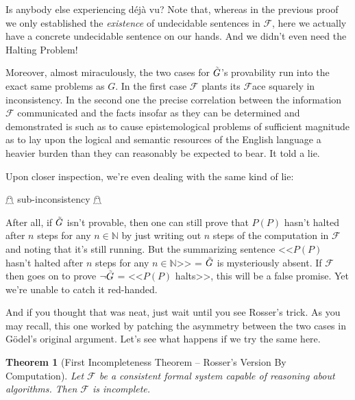 \documentclass{article}
\theoremstyle{theorem}
\newtheorem{theorem}{Theorem}
\newcommand{\infi}[1]{\accentset{\scalebox{0.35}{$\infty$}}{#1}}
\begin{document}
Is anybody else experiencing déjà vu? Note that, whereas in the previous proof we only established the \textit{existence} of undecidable sentences in $\mathcal{F}$, here we actually have a concrete undecidable sentence on our hands. And we didn't even need the Halting Problem!

Moreover, almost miraculously, the two cases for $\infi{G}$'s provability run into the exact same problems as $G$. In the first case $\mathcal{F}$ plants its $\mathcal{F}$ace squarely in inconsistency. In the second one the precise correlation between the information $\mathcal{F}$ communicated and the facts insofar as they can be determined and demonstrated is such as to cause epistemological problems of sufficient magnitude as to lay upon the logical and semantic resources of the English language a heavier burden than they can reasonably be expected to bear. It told a lie.\cite{yes-prime-minister}

Upon closer inspection, we're even dealing with the same kind of lie:
\begin{center}
$\mathghost$ sub-inconsistency $\mathghost$
\end{center}
After all, if $\infi{G}$ isn't provable, then one can still prove that $P(P)$ hasn't halted after $n$ steps for any $n\in\mathbb{N}$ by just writing out $n$ steps of the computation in $\mathcal{F}$ and noting that it's still running. But the summarizing sentence <<$P(P)$ hasn't halted after $n$ steps for any $n\in\mathbb{N}$>> = $\infi{G}$ is mysteriously absent. If $\mathcal{F}$ then goes on to prove $\neg \infi{G}$ = <<$P(P)$ halts>>, this will be a false promise. Yet we're unable to catch it red-handed.

And if you thought that was neat, just wait until you see Rosser's trick. As you may recall, this one worked by patching the asymmetry between the two cases in Gödel's original argument. Let's see what happens if we try the same here.

\begin{theorem}[First Incompleteness Theorem -- Rosser's Version By Computation]
Let $\mathcal{F}$ be a consistent formal system capable of reasoning about algorithms. Then $\mathcal{F}$ is incomplete.
\end{theorem}
\end{document}
